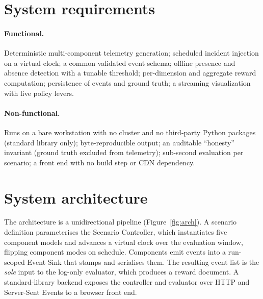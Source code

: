 \documentclass[11pt]{article}
\begin{document}
\section{System requirements}
\paragraph{Functional.} Deterministic multi-component telemetry generation;
scheduled incident injection on a virtual clock; a common validated event schema;
offline presence and absence detection with a tunable threshold; per-dimension and
aggregate reward computation; persistence of events and ground truth; a streaming
visualization with live policy levers.

\paragraph{Non-functional.} Runs on a bare workstation with no cluster and no
third-party Python packages (standard library only); byte-reproducible output; an
auditable ``honesty'' invariant (ground truth excluded from telemetry); sub-second
evaluation per scenario; a front end with no build step or CDN dependency.

\section{System architecture}
\label{sec:arch}
The architecture is a unidirectional pipeline (Figure~\ref{fig:arch}). A scenario
definition parameterises the Scenario Controller, which instantiates five
component models and advances a virtual clock over the evaluation window, flipping
component modes on schedule. Components emit events into a run-scoped Event Sink
that stamps and serialises them. The resulting event list is the \emph{sole}
input to the log-only evaluator, which produces a reward document. A
standard-library backend exposes the controller and evaluator over HTTP and
Server-Sent Events to a browser front end.
\end{document}
